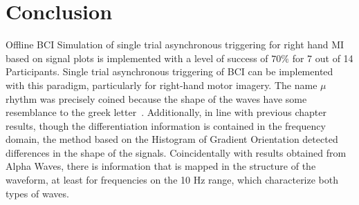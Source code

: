    
\section{Conclusion}

Offline BCI Simulation of single trial asynchronous triggering for right hand MI based on signal plots is implemented with a level of success of $70\%$ for 7 out of 14 Participants. Single trial asynchronous triggering of BCI can be implemented with this paradigm, particularly for right-hand motor imagery. The name $\mu$ rhythm was precisely coined because the shape of the waves have some resemblance to the greek letter~\cite{Cole2017}.   Additionally, in line with previous chapter results, though the differentiation information is contained in the frequency domain, the method based on the Histogram of Gradient Orientation detected differences in the shape of the signals.  Coincidentally with results obtained from Alpha Waves, there is information that is mapped in the structure of the waveform, at least for frequencies on the 10 Hz range, which characterize both types of waves.



